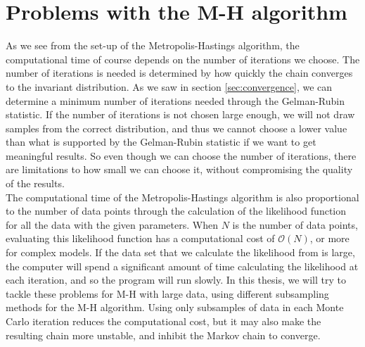 \section{Problems with the M-H algorithm}
As we see from the set-up of the Metropolis-Hastings algorithm, the computational time of course depends on the number of iterations we choose. 
The number of iterations is needed is determined by how quickly the chain converges to the invariant distribution.
As we saw in section \ref{sec:convergence}, we can determine a minimum number of iterations needed through the Gelman-Rubin statistic. 
If the number of iterations is not chosen large enough, we will not draw samples from the correct distribution, and thus we cannot choose a lower value than what is supported by the Gelman-Rubin statistic if we want to get meaningful results. So even though we can choose the number of iterations, there are limitations to how small we can choose it, without compromising the quality of the results. 
\\
The computational time of the Metropolis-Hastings algorithm is also proportional to the number of data points through the calculation of the likelihood function for all the data with the given parameters.
When $N$ is the number of data points, evaluating this likelihood function has a computational cost of  $\mathcal{O}(N)$, or more for complex models. 
If the data set that we calculate the likelihood from is large, the computer will spend a significant amount of time calculating the likelihood at each iteration, and so the program will run slowly. 
In this thesis, we will try to tackle these problems for M-H with large data, using different subsampling methods for the M-H algorithm. 
Using only subsamples of data in each Monte Carlo iteration reduces the computational cost, but it may also make the resulting chain more unstable, and inhibit the Markov chain to converge. 
